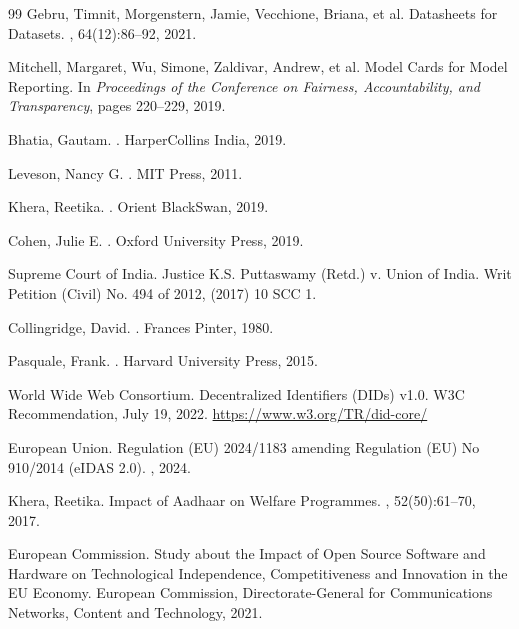 \documentclass{article}
\begin{document}
\begin{thebibliography}{99}
Gebru, Timnit, Morgenstern, Jamie, Vecchione, Briana, et al.
\newblock Datasheets for Datasets.
, 64(12):86--92, 2021.

Mitchell, Margaret, Wu, Simone, Zaldivar, Andrew, et al.
\newblock Model Cards for Model Reporting.
\newblock In {\em Proceedings of the Conference on Fairness, Accountability, and Transparency}, pages 220--229, 2019.

Bhatia, Gautam.
.
\newblock HarperCollins India, 2019.

Leveson, Nancy G.
.
\newblock MIT Press, 2011.

Khera, Reetika.
.
\newblock Orient BlackSwan, 2019.

Cohen, Julie E.
.
\newblock Oxford University Press, 2019.

Supreme Court of India.
\newblock Justice K.S. Puttaswamy (Retd.) v. Union of India.
\newblock Writ Petition (Civil) No. 494 of 2012, (2017) 10 SCC 1.

Collingridge, David.
.
\newblock Frances Pinter, 1980.

Pasquale, Frank.
.
\newblock Harvard University Press, 2015.

World Wide Web Consortium.
\newblock Decentralized Identifiers (DIDs) v1.0.
\newblock W3C Recommendation, July 19, 2022.
\newblock \url{https://www.w3.org/TR/did-core/}

European Union.
\newblock Regulation (EU) 2024/1183 amending Regulation (EU) No 910/2014 (eIDAS 2.0).
, 2024.

Khera, Reetika.
\newblock Impact of Aadhaar on Welfare Programmes.
, 52(50):61--70, 2017.

European Commission.
\newblock Study about the Impact of Open Source Software and Hardware on Technological Independence, Competitiveness and Innovation in the EU Economy.
\newblock European Commission, Directorate-General for Communications Networks, Content and Technology, 2021.

\end{thebibliography}
\end{document}
